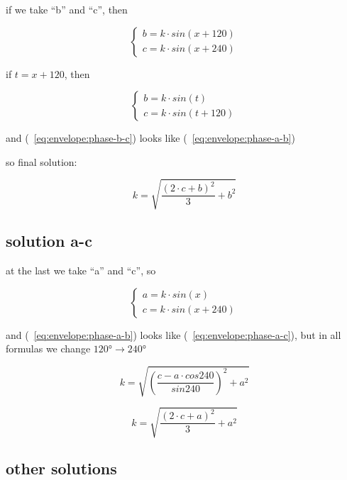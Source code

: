 \documentclass[unicode, 12pt, a4paper]{article}
\begin{document}
if we take ``b'' and ``c'', then

\begin{equation}
  \begin{cases}
    b = k \cdot sin(x + 120)\\
    c = k \cdot sin(x + 240)
  \end{cases}
\end{equation}

if $t = x + 120$, then

\begin{equation}
  \label{eq:envelope:phase-b-c}
  \begin{cases}
    b = k \cdot sin(t)\\
    c = k \cdot sin(t + 120)
  \end{cases}
\end{equation}

and (~\ref{eq:envelope:phase-b-c}) looks like (~\ref{eq:envelope:phase-a-b})

so final solution:

\begin{equation}
  k = \sqrt{\frac{(2 \cdot c + b)^2}{3} + b^2}
\end{equation}


\subsection{solution a-c}

at the last we take ``a'' and ``c'', so

\begin{equation}
  \label{eq:envelope:phase-a-c}
  \begin{cases}
    a = k \cdot sin(x)\\
    c = k \cdot sin(x + 240)
  \end{cases}
\end{equation}

and (~\ref{eq:envelope:phase-a-b}) looks like (~\ref{eq:envelope:phase-a-c}), but in all formulas we change $120° \rightarrow 240°$

\begin{equation}
  k = \sqrt{\left(\frac{c - a \cdot cos 240}{sin 240}\right)^2 + a^2}
\end{equation}

\begin{equation}
  k = \sqrt{\frac{(2 \cdot c + a)^2}{3} + a^2}
\end{equation}

\subsection{other solutions}
\end{document}
